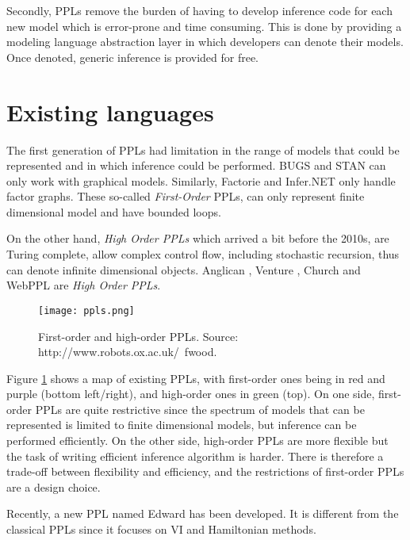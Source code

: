 Secondly, \glspl{PPL} remove the burden of having to develop inference code for each new model which is error-prone and time consuming.
This is done by providing a modeling language abstraction layer in which developers can denote their models.  Once denoted, generic inference is provided for free.

\section{Existing languages} \label{PPL_history}

The first generation of \glspl{PPL} had limitation in the range of models that could be represented and in which inference could be performed.
BUGS \cite{Bugs} and STAN \cite{Stan} can only work with graphical models.
Similarly, Factorie \cite{Factorie} and Infer.NET \cite{InferNET} only handle factor graphs.
These so-called \textit{First-Order} \gls{PPLs}, can only represent finite dimensional model and have bounded loops.

On the other hand, \textit{High Order \gls{PPLs}} which arrived a bit before the 2010s, are Turing complete, allow complex control flow, including stochastic recursion, thus can denote infinite dimensional objects.
Anglican \cite{wood-aistats-2014}, Venture \cite{Mansinghka:2014ty}, Church \cite{Goodman:2012uq} and WebPPL \cite{dippl} are \textit{High Order \gls{PPLs}}.

\begin{figure}[h!]
\centering
    \texttt{[image: ppls.png]} 
    \caption{First-order and high-order \glspl{PPL}. Source: http://www.robots.ox.ac.uk/~fwood.}
    \label{fig:ppls} 
\end{figure}

Figure \ref{fig:ppls} shows a map of existing \glspl{PPL}, with first-order ones being in red and purple (bottom left/right), and high-order ones in green (top).
On one side, first-order \glspl{PPL} are quite restrictive since the spectrum of models that can be represented is limited to finite dimensional models, but inference can be performed efficiently.
On the other side, high-order \glspl{PPL} are more flexible but the task of writing efficient inference algorithm is harder.
There is therefore a trade-off between flexibility and efficiency, and the restrictions of first-order \glspl{PPL} are a design choice.

Recently, a new \gls{PPL} named Edward \cite{Edward} has been developed. It is different from the classical \glspl{PPL} since it focuses on \gls{VI} and Hamiltonian methods.



